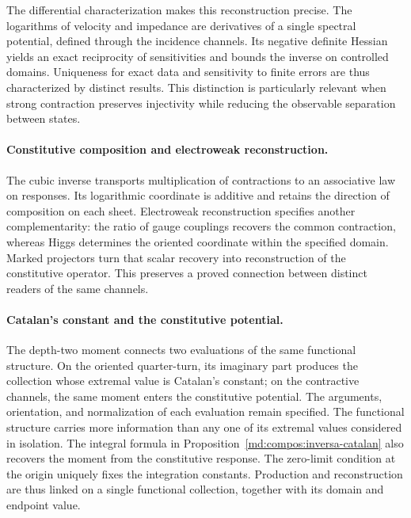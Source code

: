 The differential characterization makes this reconstruction precise.
The logarithms of velocity and impedance are derivatives of a single
spectral potential, defined through the incidence channels. Its negative
definite Hessian yields an exact reciprocity of sensitivities and bounds
the inverse on controlled domains. Uniqueness for exact data and
sensitivity to finite errors are thus characterized by distinct results.
This distinction is particularly relevant when strong contraction
preserves injectivity while reducing the observable separation between
states.

\paragraph{Constitutive composition and electroweak reconstruction.}
The cubic inverse transports multiplication of contractions to an
associative law on responses. Its logarithmic coordinate is additive
and retains the direction of composition on each sheet. Electroweak
reconstruction specifies another complementarity: the ratio of gauge
couplings recovers the common contraction, whereas Higgs determines
the oriented coordinate within the specified domain. Marked projectors
turn that scalar recovery into reconstruction of the constitutive
operator. This preserves a proved connection between distinct readers
of the same channels.

\paragraph{Catalan's constant and the constitutive potential.}
The depth-two moment connects two evaluations of the same functional
structure. On the oriented quarter-turn, its imaginary part produces the
collection whose extremal value is Catalan's constant; on the contractive
channels, the same moment enters the constitutive potential. The
arguments, orientation, and normalization of each evaluation remain
specified. The functional structure carries more information than any
one of its extremal values considered in isolation.
The integral formula in Proposition~\ref{md:compos:inversa-catalan}
also recovers the moment from the constitutive response. The zero-limit
condition at the origin uniquely fixes the integration constants.
Production and reconstruction are thus linked on a single functional
collection, together with its domain and endpoint value.

\newpage
